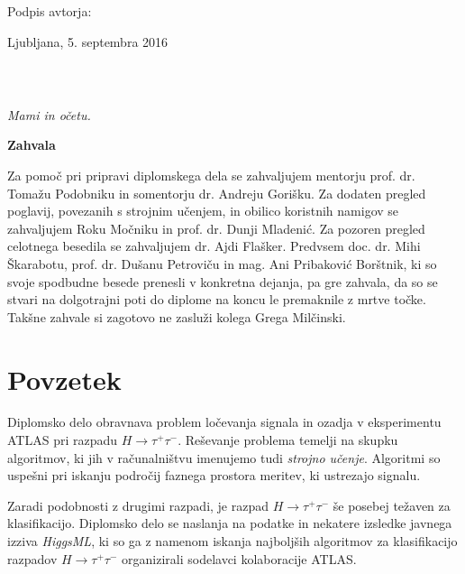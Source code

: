 \vspace{1cm}
\hspace{9cm} Podpis avtorja:

\vspace{2cm}

Ljubljana, 5. septembra 2016 
\newpage

\ \thispagestyle{empty}
\newpage

\thispagestyle{empty}

$\;$ 

\vspace{5cm}
\hfill {\Large \em Mami in očetu.}
\thispagestyle{empty}

\vfill
{\LARGE \textbf{Zahvala}}
\vspace{0.5cm}

Za pomoč pri pripravi diplomskega dela se zahvaljujem mentorju prof. dr. Tomažu Podobniku in somentorju dr. Andreju Gorišku. Za dodaten pregled poglavij, povezanih s strojnim učenjem, in obilico koristnih namigov se zahvaljujem Roku Močniku in prof. dr. Dunji Mladenić. Za pozoren pregled celotnega besedila se zahvaljujem dr. Ajdi Flašker. Predvsem doc. dr. Mihi Škarabotu, prof. dr. Dušanu Petroviču in mag. Ani Pribaković Borštnik, ki so svoje spodbudne besede prenesli v konkretna dejanja, pa gre zahvala, da so se stvari na dolgotrajni poti do diplome na koncu le premaknile z mrtve točke. Takšne zahvale si zagotovo ne zasluži kolega Grega Milčinski.



\newpage
\setlength{\parindent}{0.7cm}
\setlength{\parskip}{0.1cm}


\chapter*{Povzetek}
\noindent Diplomsko delo obravnava problem ločevanja signala in ozadja v eksperimentu ATLAS pri razpadu $H \rightarrow \tau^+\tau^-$. Reševanje problema temelji na skupku algoritmov, ki jih v računalništvu imenujemo tudi \textit{strojno učenje}. Algoritmi so uspešni pri iskanju področij faznega prostora meritev, ki ustrezajo signalu.

Zaradi podobnosti z drugimi razpadi, je razpad $H \rightarrow \tau^+\tau^-$ še posebej težaven za klasifikacijo. Diplomsko delo se naslanja na podatke in nekatere izsledke javnega izziva \textit{HiggsML}, ki so ga z namenom iskanja najboljših algoritmov za klasifikacijo razpadov $H \rightarrow \tau^+\tau^-$ organizirali sodelavci kolaboracije ATLAS.

